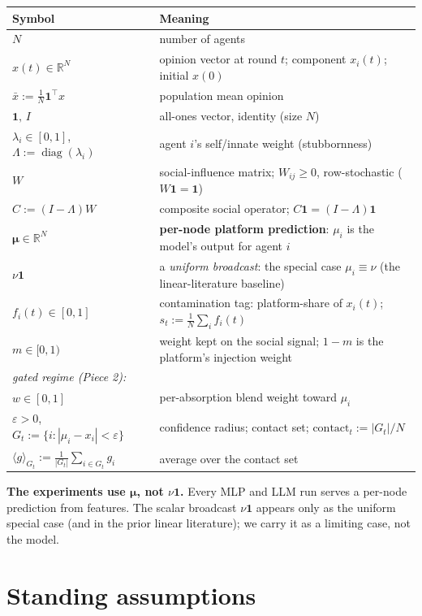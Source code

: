 \documentclass[11pt]{article}
\theoremstyle{definition}
\newcommand{\one}{\mathbf{1}}
\newcommand{\R}{\mathbb{R}}
\DeclareMathOperator{\diag}{diag}
\begin{document}
\begin{center}
\renewcommand{\arraystretch}{1.25}
\begin{tabular}{ll}
\hline
Symbol & Meaning\\
\hline
$N$ & number of agents\\
$x(t)\in\R^N$ & opinion vector at round $t$; component $x_i(t)$; initial $x(0)$\\
$\bar x:=\tfrac1N\one^{\!\top}x$ & population mean opinion\\
$\one,\,I$ & all-ones vector, identity (size $N$)\\
$\lambda_i\in[0,1]$,\ $\Lambda:=\diag(\lambda_i)$ & agent $i$'s self/innate weight (stubbornness)\\
$W$ & social-influence matrix; $W_{ij}\ge0$, row-stochastic ($W\one=\one$)\\
$C:=(I-\Lambda)W$ & composite social operator; $C\one=(I-\Lambda)\one$\\
$\bm{\mu}\in\R^N$ & \textbf{per-node platform prediction}: $\mu_i$ is the model's output for agent $i$\\
$\nu\one$ & a \emph{uniform broadcast}: the special case $\mu_i\equiv\nu$ (the linear-literature baseline)\\
$f_i(t)\in[0,1]$ & contamination tag: platform-share of $x_i(t)$; $s_t:=\tfrac1N\sum_i f_i(t)$\\
$m\in[0,1)$ & weight kept on the social signal; $1-m$ is the platform's injection weight\\
\multicolumn{2}{l}{\emph{gated regime (Piece 2):}}\\
$w\in[0,1]$ & per-absorption blend weight toward $\mu_i$\\
$\varepsilon>0$,\ $G_t:=\{i:|\mu_i-x_i|<\varepsilon\}$ & confidence radius; contact set; $\mathrm{contact}_t:=|G_t|/N$\\
$\langle g\rangle_{G_t}:=\tfrac1{|G_t|}\sum_{i\in G_t}g_i$ & average over the contact set\\
\hline
\end{tabular}
\end{center}

\noindent\textbf{The experiments use $\bm{\mu}$, not $\nu\one$.} Every MLP and LLM run
serves a per-node prediction from features. The scalar broadcast $\nu\one$ appears only
as the uniform special case (and in the prior linear literature); we carry it as a
limiting case, not the model.

\section{Standing assumptions}
\end{document}
